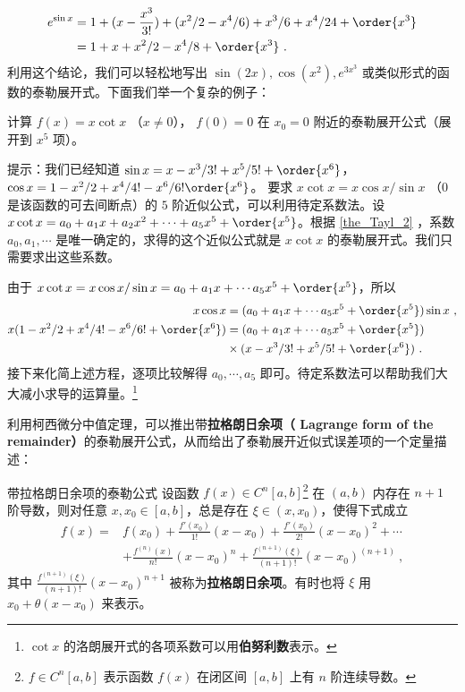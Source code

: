 \begin{equation}
\begin{aligned}
e^{\sin x}&=1+(x-\frac{x^3}{3!})+(x^2/2-x^4/6)+x^3/6+x^4/24+\order{x^3}
\\&=1+x+x^2/2-x^4/8+\order{x^3}~.
\end{aligned}
\end{equation}
利用这个结论，我们可以轻松地写出 $\sin (2x),\cos(x^2),e^{3x^3}$ 或类似形式的函数的泰勒展开式。下面我们举一个复杂的例子：
\begin{exercise}{}
计算 $f(x)=x\cot x$ （$x\neq 0$）， $f(0)=0$ 在 $x_0=0$ 附近的泰勒展开公式（展开到 $x^5$ 项）。
\end{exercise}
提示：我们已经知道 $\sin x=x-x^3/3!+x^5/5!+\order{x^6}$， $\cos x=1-x^2/2+x^4/4!-x^6/6!\order{x^6}$。 要求 $x\cot x=x\cos x/\sin x$ （$0$ 是该函数的可去间断点）的 $5$ 阶近似公式，可以利用待定系数法。设 $x\cot x=a_0+a_1 x+a_2 x^2+\cdots+ a_5 x^5 + \order{x^5}$。根据 \autoref{the_Tayl_2}  ，系数 $a_0,a_1,\cdots$ 是唯一确定的，求得的这个近似公式就是 $x\cot x$ 的泰勒展开式。我们只需要求出这些系数。

由于 $x\cot x=x\cos x/\sin x=a_0+a_1 x+\cdots a_5 x^5+\order{x^5}$，所以
\begin{equation}
\begin{aligned}
x\cos x&=(a_0+a_1 x+\cdots a_5 x^5+\order{x^5})\sin x~,\\
x(1-x^2/2+x^4/4!-x^6/6!+\order{x^6})&=(a_0+a_1 x+\cdots a_5 x^5+\order{x^5})\\
&\times (x-x^3/3!+x^5/5!+\order{x^6})~.
\end{aligned}
\end{equation}
接下来化简上述方程，逐项比较解得 $a_0,\cdots,a_5$ 即可。待定系数法可以帮助我们大大减小求导的运算量。\footnote{$\cot x$ 的洛朗展开式的各项系数可以用\textbf{伯努利数}表示。}

利用柯西微分中值定理，可以推出带\textbf{拉格朗日余项（ Lagrange form of the remainder）}的泰勒展开公式，从而给出了泰勒展开近似式误差项的一个定量描述：
\begin{theorem}{带拉格朗日余项的泰勒公式}
设函数 $f(x)\in C^n[a,b]$\footnote{$f\in C^n[a,b]$ 表示函数 $f(x)$ 在闭区间 $[a,b]$ 上有 $n$ 阶连续导数。} 在 $(a,b)$ 内存在 $n+1$ 阶导数，则对任意 $x,x_0\in [a,b]$，总是存在 $\xi\in (x,x_0)$，使得下式成立
\begin{equation}\label{eq_Tayl_3}
\begin{aligned}
f(x)=&f(x_0)+\frac{f'(x_0)}{1!}(x-x_0)+\frac{f'(x_0)}{2!}(x-x_0)^2+\cdots\\
&+\frac{f^{(n)}(x)}{n!}(x-x_0)^n+\frac{f^{(n+1)}(\xi)}{(n+1)!}(x-x_0)^{(n+1)}~,
\end{aligned}
\end{equation}
其中 $\frac{f^{(n+1)}(\xi)}{(n+1)!}(x-x_0)^{n+1}$ 被称为\textbf{拉格朗日余项}。有时也将 $\xi$ 用 $x_0+\theta(x-x_0)$ 来表示。
\end{theorem}

